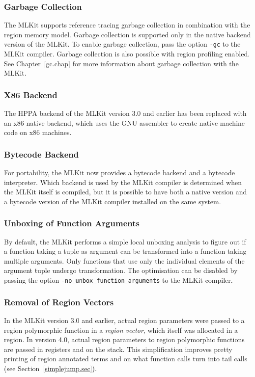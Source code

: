 \documentclass[12pt]{book}
\begin{document}
\subsubsection*{Garbage Collection}
%
The MLKit supports reference tracing garbage collection in
combination with the region memory model. Garbage collection is
supported only in the native backend version of the MLKit. To enable
garbage collection, pass the option \texttt{-gc} to the MLKit compiler. Garbage
collection is also possible with region profiling enabled. See
Chapter~\ref{gc.chap} for more information about garbage collection
with the MLKit.

\subsubsection*{X86 Backend}
The
%
HPPA backend of the MLKit version 3.0 and earlier has been replaced
with an
%
x86 native backend, which uses the GNU assembler to create native
machine code on x86 machines.

\subsubsection*{Bytecode Backend}
%
For portability, the MLKit now provides a bytecode backend and a
bytecode interpreter. Which backend is used by the MLKit compiler is
determined when the MLKit itself is compiled, but it is possible to have
both a native version and a bytecode version of the MLKit compiler
installed on the same system.

\subsubsection*{Unboxing of Function Arguments}
%
%
%
By default, the MLKit performs a simple local unboxing analysis to
figure out if a function taking a tuple as argument can be transformed
into a function taking multiple arguments. Only functions that use
only the individual elements of the argument tuple undergo
transformation. The optimisation can be disabled by passing the option
\texttt{-no\_unbox\_function\_arguments} to the MLKit compiler.

\subsubsection*{Removal of Region Vectors}
%
In the MLKit version 3.0 and earlier, actual region parameters were
passed to a region polymorphic function in a {\em region vector},
which itself was allocated in a region. In version 4.0, actual region
parameters to
%
region polymorphic functions are passed in registers and on the stack.
This simplification improves pretty printing of region annotated terms
and on what function calls turn into tail calls (see
Section~\ref{simplejump.sec}).
\end{document}
